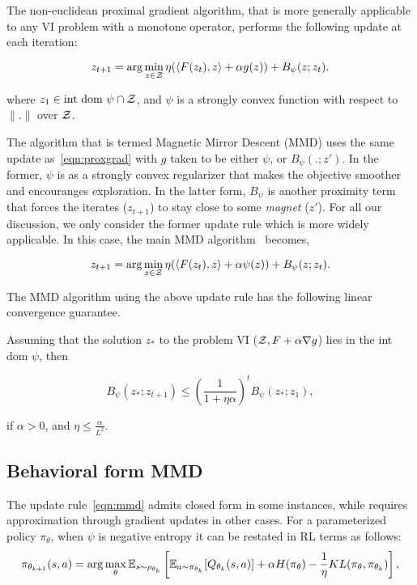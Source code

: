 The non-euclidean proximal gradient algorithm, that is more generally applicable to any VI problem
with a monotone operator, performs the following update at each iteration:

\begin{equation}
	\label{eqn:proxgrad} z_{t+1} = \arg \min_{z \in \mathcal{Z}} \eta (\langle F(z_t),
	z\rangle + \alpha g(z)) + B_{\psi} (z; z_t).
\end{equation}

where $z_1 \in \text{int dom } \psi \cap \mathcal{Z}$, and $\psi$ is a strongly convex function with respect to $\|.\|$ over $\mathcal{Z}$.

The algorithm that is termed Magnetic Mirror Descent (MMD) uses the same update
as~\ref{eqn:proxgrad} with $g$ taken to be either $\psi$, or $B_{\psi}(.
	;z')$.
In the former, $\psi$ is as a strongly convex regularizer that makes the objective smoother and
encouranges exploration.
In the latter form, $B_{\psi}$ is another proximity term that forces the iterates ($z_{t+1}$) to
stay close to some \textit{magnet} ($z'$).
For all our discussion, we only consider the former update rule which is more widely applicable.
In this case, the main MMD algorithm~\cite[(Algorithm 3.6)]{sokotaUnified2023} becomes,

\begin{equation}
	\label{eqn:mmd} z_{t+1} = \arg \min_{z \in \mathcal{Z}} \eta
	(\langle F(z_t), z\rangle + \alpha \psi(z)) + B_{\psi} (z; z_t).
\end{equation}

The MMD algorithm using the above update rule has the following linear convergence guarantee.
\begin{theorem}
	\label{thm:mmdconv}
	\cite[Theorem 3.4]{sokotaUnified2023}
	Assuming that the solution $z_{\ast}$ to the problem VI ($\mathcal{Z}, F + \alpha \nabla g$) lies in the
	int dom $\psi$, then

	\[ B_{\psi} (z_{\ast}; z_{t + 1}) \leq { \left(\frac{1}{1
				+ \eta \alpha}\right)}^t B_{\psi} (z_{\ast}; z_1), \]

	if $\alpha > 0$, and
	$\eta \leq \frac{\alpha}{L^2}$.
\end{theorem}

\subsection{Behavioral form MMD}

The update rule~\ref{eqn:mmd} admits closed form in some instances, while requires approximation
through gradient updates in other cases.
For a parameterized policy $\pi_\theta$, when $\psi$ is negative entropy it can be restated in RL
terms as follows:
\begin{equation}
	\label{eqn:mmdbf} \pi_{ \theta_{k+1}}(s,a) = \arg \max_{\theta}
	\mathbb{E}_{s \sim \rho_{\theta_k}} \left[ \mathbb{E}_{a \sim \pi_{\theta_k}} [Q_{\theta_k}(s, a)] + \alpha
		H(\pi_\theta) - \frac{1}{\eta} KL(\pi_\theta, \pi_{\theta_k}) \right],
\end{equation}

